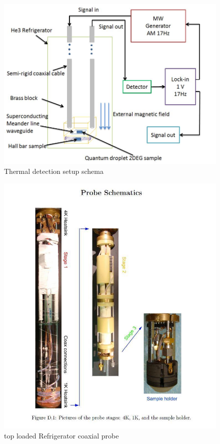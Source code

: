 \documentclass[12pt]{ruthesis}
\begin{document}
 

\begin{figure}
  \centering
  \includegraphics[scale=0.5]{figures/SCHEMA.JPG}
  \caption{Thermal detection setup schema}
  \label{thermal-schema}
\end{figure}
 
 
\begin{figure}
  \centering
  \includegraphics[scale=0.5]{figures/probe.JPG}
  \caption{ top loaded Refrigerator coaxial probe}
  \label{probe}
\end{figure}
\end{document}
